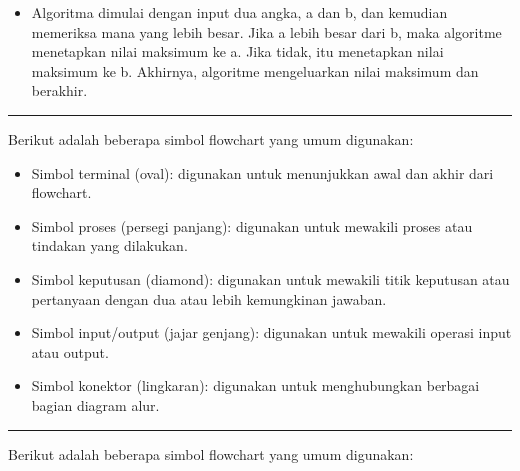 \documentclass[12pt,preprintnumbers,amsmath,amssymb,nofootinbib,superscriptaddress]{revtex4-1}
\begin{document}
\begin{itemize}
    \item Algoritma dimulai dengan input dua angka, a dan b, dan kemudian memeriksa mana yang lebih besar. Jika a lebih besar dari b, maka algoritme menetapkan nilai maksimum ke a. Jika tidak, itu menetapkan nilai maksimum ke b. Akhirnya, algoritme mengeluarkan nilai maksimum dan berakhir.
\end{itemize}


\vspace{1cm}

\newpage


\label{Ueff}
\vspace{-0.7cm}
\vspace{-0.2cm}\hrule

\vspace{2cm}

Berikut adalah beberapa simbol flowchart yang umum digunakan:

\begin{itemize}
    \item Simbol terminal (oval): digunakan untuk menunjukkan awal dan akhir dari flowchart.
    \item Simbol proses (persegi panjang): digunakan untuk mewakili proses atau tindakan yang dilakukan.
    \item Simbol keputusan (diamond): digunakan untuk mewakili titik keputusan atau pertanyaan dengan dua atau lebih kemungkinan jawaban.
    \item Simbol input/output (jajar genjang): digunakan untuk mewakili operasi input atau output.
    \item Simbol konektor (lingkaran): digunakan untuk menghubungkan berbagai bagian diagram alur.
\end{itemize}


\vspace{1cm}

\newpage

\label{Ueff}
\vspace{-0.7cm}
\vspace{-0.2cm}\hrule

\vspace{2cm}

Berikut adalah beberapa simbol flowchart yang umum digunakan:
\end{document}
